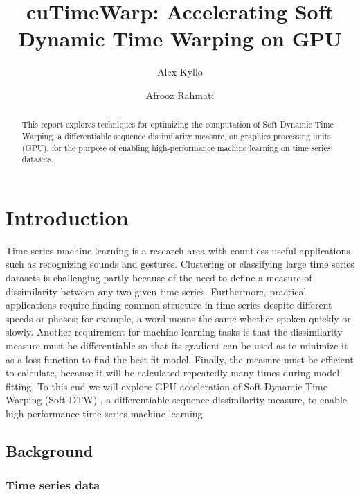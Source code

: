 \documentclass[12pt, letterpaper]{article}
\title{cuTimeWarp: Accelerating Soft Dynamic Time Warping on GPU}
\author{Alex Kyllo \and Afrooz Rahmati}
\begin{document}
\maketitle

\begin{abstract}

This report explores techniques for optimizing the computation of Soft Dynamic
Time Warping, a differentiable sequence dissimilarity measure, on graphics
processing units (GPU), for the purpose of enabling high-performance machine
learning on time series datasets.

\end{abstract}

\section{Introduction}

Time series machine learning is a research area with countless useful
applications such as recognizing sounds and gestures. Clustering or classifying
large time series datasets is challenging partly because of the need to define a
measure of dissimilarity between any two given time series. Furthermore,
practical applications require finding common structure in time series despite
different speeds or phases; for example, a word means the same whether spoken
quickly or slowly. Another requirement for machine learning tasks is that the
dissimilarity measure must be differentiable so that its gradient can be used as
to minimize it as a loss function to find the best fit model. Finally, the
measure must be efficient to calculate, because it will be calculated repeatedly
many times during model fitting. To this end we will explore GPU acceleration of
Soft Dynamic Time Warping (Soft-DTW) \cite{cuturi_soft-dtw_2018}, a
differentiable sequence dissimilarity measure, to enable high performance time
series machine learning.

\subsection{Background}

\subsubsection{Time series data}
\end{document}
